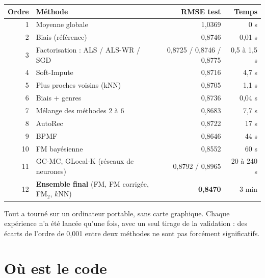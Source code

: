 \documentclass[11pt,a4paper]{article}
\begin{document}
\begin{center}
\begin{tabularx}{\linewidth}{@{}rXrr@{}}
\toprule
\textbf{Ordre} & \textbf{Méthode} & \textbf{RMSE test} & \textbf{Temps} \\
\midrule
1 & Moyenne globale & 1,0369 & 0 s \\
2 & Biais (référence) & 0,8746 & 0,01 s \\
3 & Factorisation : ALS / ALS-WR / SGD & 0,8725 / 0,8746 / 0,8775 & 0,5 à 1,5 s \\
4 & Soft-Impute & 0,8716 & 4,7 s \\
5 & Plus proches voisins (kNN) & 0,8705 & 1,1 s \\
6 & Biais + genres & 0,8736 & 0,04 s \\
7 & Mélange des méthodes 2 à 6 & 0,8683 & 7,7 s \\
8 & AutoRec & 0,8722 & 17 s \\
9 & BPMF & 0,8646 & 44 s \\
10 & FM bayésienne & 0,8552 & 60 s \\
11 & GC-MC, GLocal-K (réseaux de neurones) & 0,8792 / 0,8965 & 20 à 240 s \\
12 & \textbf{Ensemble final} (FM, FM corrigée, FM$_2$, $k$NN) & \textbf{0,8470} & 3 min \\
\bottomrule
\end{tabularx}
\end{center}

Tout a tourné sur un ordinateur portable, sans carte graphique. Chaque expérience n'a été
lancée qu'une fois, avec un seul tirage de la validation : des écarts de l'ordre de 0,001
entre deux méthodes ne sont pas forcément significatifs.

\section{Où est le code}
\end{document}
